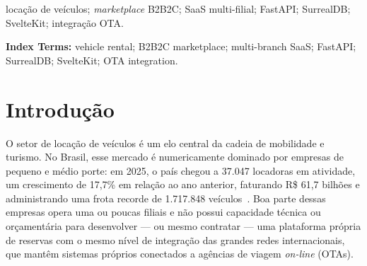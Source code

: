 \documentclass[conference,a4paper]{IEEEtran}
\begin{document}
\begin{IEEEkeywords}
locação de veículos; \textit{marketplace} B2B2C; SaaS multi-filial; FastAPI; SurrealDB; SvelteKit; integração OTA.
\end{IEEEkeywords}

\begin{otherlanguage}{english}
\renewcommand{\abstractname}{Abstract}
\begin{abstract}
The Brazilian vehicle rental market is largely served by closed, single-tenant management systems designed for a single rental company, with no native support for multi-branch operations, for assembling a marketplace that brings together different rental companies under a single search point, or for integration with online travel agencies (OTAs). This article presents the development of the CarRental Marketplace, a B2B2C (\textit{business-to-business-to-consumer}) vehicle rental platform that connects rental companies, their branches, and end customers within a single web system, following a pay-at-desk model. The platform was built on a decoupled client-server architecture --- a Python/FastAPI backend, persistence in SurrealDB (a multi-model document-and-graph database), and a SvelteKit frontend --- and implements role-based authentication via JSON Web Tokens, a pricing engine, an availability ledger to prevent overbooking, a state machine governing the reservation lifecycle, and a dedicated API for OTA partners. Development was guided by the elicitation of 49 user stories and documented through domain and system class diagrams, the logical data model, and sequence diagrams for each screen. As a result, a functional platform was produced that materializes, in code, the domain concepts identified during analysis.
\end{abstract}

\noindent\textbf{Index Terms:} vehicle rental; B2B2C marketplace; multi-branch SaaS; FastAPI; SurrealDB; SvelteKit; OTA integration.
\end{otherlanguage}

\section{Introdução}

O setor de locação de veículos é um elo central da cadeia de mobilidade e turismo. No Brasil, esse mercado é numericamente dominado por empresas de pequeno e médio porte: em 2025, o país chegou a 37.047 locadoras em atividade, um crescimento de 17,7\% em relação ao ano anterior, faturando R\$ 61,7 bilhões e administrando uma frota recorde de 1.717.848 veículos~\cite{abla2025, calmon2026}. Boa parte dessas empresas opera uma ou poucas filiais e não possui capacidade técnica ou orçamentária para desenvolver --- ou mesmo contratar --- uma plataforma própria de reservas com o mesmo nível de integração das grandes redes internacionais, que mantêm sistemas próprios conectados a agências de viagem \textit{on-line} (OTAs).
\end{document}
